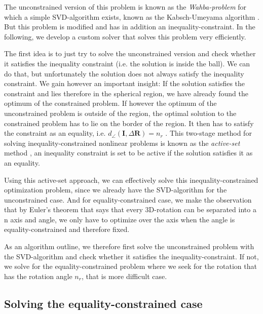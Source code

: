 The unconstrained version of this problem is known as the \textit{Wahba-problem} for which a simple SVD-algorithm exists, known as the Kabsch-Umeyama algorithm \cite{Kabsch-1978-Point-set-alignment} \cite{Least-squares-estimation-point-sets-Umeyama-1991} \cite{Lawrence2019APA}. But this problem is modified and has in addition an inequality-constraint. In the following, we develop a custom solver that solves this problem very efficiently. 

The first idea is to just try to solve the unconstrained version and check whether it satisfies the inequality constraint (i.e. the solution is inside the ball). 
We can do that, but unfortunately the solution does not always satisfy the inequality constraint. We gain however an important insight: If the solution satisfies the constraint and lies therefore in the spherical region, we have already found the optimum of the constrained problem. If however the optimum of the unconstrained problem is outside of the region, the optimal solution to the constrained problem has to lie on the border of the region. It then has to satisfy the constraint as an equality, i.e. $ d_{\angle}(\mathbf{I}, \Delta\mathbf{R})  = n_r$ \cite[Ch.15 p.424-427]{Numerical-Optimization-Nocedal-Wright}.
This two-stage method for solving inequality-constrained nonlinear problems is known as the \textit{active-set} method \cite[Ch. 16.5, p.467]{Numerical-Optimization-Nocedal-Wright}, an inequality constraint is set to be active if the solution satisfies it as an equality. 

Using this active-set approach, we can effectively solve this inequality-constrained optimization problem, since we already have the SVD-algorithm for the unconstrained case. And for equality-constrained case, we make the observation that by Euler's theorem that says that every 3D-rotation can be separated into a n axis and angle, we only have to optimize over the axis when the angle is equality-constrained and therefore fixed.

As an algorithm outline, we therefore first solve the unconstrained problem with the SVD-algorithm and check whether it satisfies the inequality-constraint. If not, we solve for the equality-constrained problem where we seek for the rotation that has the rotation angle $n_r$, that is more difficult case.


\subsection{Solving the equality-constrained case}

